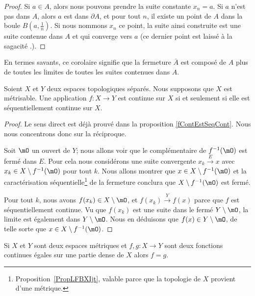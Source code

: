 \begin{proof}
	Si \( a\in A\), alors nous pouvons prendre la suite constante \( x_n=a\). Si \( a\) n'est pas dans \( A\), alors \( a\) est dans \( \partial A\), et pour tout \( n\), il existe un point de \( A\) dans la boule \( B(a,\frac{1}{ n })\). Si nous nommons \( x_n\) ce point, la suite ainsi construite est une suite contenue dans \( A\) et qui converge vers \( a\) (ce dernier point est laissé à la sagacité .).
\end{proof}

En termes savants, ce corolaire signifie que la fermeture \( \bar A\) est composé de \( A\) plus de toutes les limites de toutes les suites contenues dans \( A\).

\begin{proposition}     \label{PropXIAQSXr}
	Soient \( X\) et \( Y\) deux espaces topologiques séparés. Nous supposons que \( X\) est métrisable. Une application \( f\colon X\to Y\) est continue sur \( X\) si et seulement si elle est séquentiellement continue sur \( X\).
\end{proposition}

\begin{proof}
	Le sens direct est déjà prouvé dans la proposition \ref{fContEstSeqCont}. Nous nous concentrons donc sur la réciproque.

	Soit \( \mO\) un ouvert de \( Y\); nous allons voir que le complémentaire de \( f^{-1}(\mO)\) est fermé dans \( E\). Pour cela nous considérons une suite convergente \( x_k\stackrel{E}{\longrightarrow} x\) avec \( x_k\in X\setminus f^{-1}(\mO)\) pour tout \( k\). Nous allons montrer que \( x\in X\setminus f^{-1}(\mO)\) et la caractérisation séquentielle\footnote{Proposition~\ref{PropLFBXIjt}, valable parce que la topologie de \( X\) provient d'une métrique.} de la fermeture conclura que \( X\setminus f^{-1}(\mO)\) est fermé.

	Pour tout \( k\), nous avons \( f(x_k)\in X\setminus \mO\), et \( f(x_k)\stackrel{Y}{\longrightarrow} f(x)\) parce que \( f\) est séquentiellement continue. Vu que \( f(x_k)\) est une suite dans le fermé \( Y\setminus \mO\), la limite est également dans \( Y\setminus \mO\). Nous en déduisons que \( f(x)\in Y\setminus \mO\), de telle sorte que \( x\in X\setminus f^{-1}(\mO)\).
\end{proof}

\begin{proposition} \label{PropCJGIooZNpnGF}
	Si \( X\) et \( Y\) sont deux espaces métriques et \( f,g\colon X\to Y\) sont deux fonctions continues égales sur une partie dense de \( X\) alors \( f=g\).
\end{proposition}

